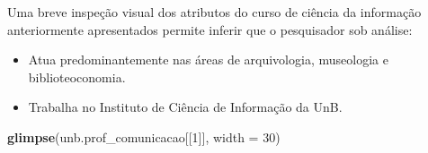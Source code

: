 \documentclass[]{article}
\newenvironment{Shaded}{\begin{snugshade}}{\end{snugshade}}
\newcommand{\KeywordTok}[1]{\textcolor[rgb]{0.13,0.29,0.53}{\textbf{#1}}}
\newcommand{\DataTypeTok}[1]{\textcolor[rgb]{0.13,0.29,0.53}{#1}}
\newcommand{\DecValTok}[1]{\textcolor[rgb]{0.00,0.00,0.81}{#1}}
\newcommand{\NormalTok}[1]{#1}
\providecommand{\tightlist}{%
  \setlength{\itemsep}{0pt}\setlength{\parskip}{0pt}}
\begin{document}
Uma breve inspeção visual dos atributos do curso de ciência da
informação anteriormente apresentados permite inferir que o pesquisador
sob análise:

\begin{itemize}
\tightlist
\item
  Atua predominantemente nas áreas de arquivologia, museologia e
  biblioteoconomia.
\item
  Trabalha no Instituto de Ciência de Informação da UnB.
\end{itemize}

\begin{Shaded}
\begin{Highlighting}[]
\KeywordTok{glimpse}\NormalTok{(unb.prof_comunicacao[[}\DecValTok{1}\NormalTok{]], }\DataTypeTok{width =} \DecValTok{30}\NormalTok{)}
\end{Highlighting}
\end{Shaded}
\end{document}
